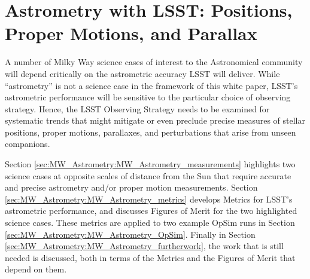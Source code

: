 \section{Astrometry with LSST: Positions, Proper Motions, and Parallax}
\def\secname{MW_Astrometry}\label{sec:\secname} %


A number of Milky Way science cases of interest to the Astronomical
community will depend critically on the astrometric accuracy LSST will
deliver. While ``astrometry'' is not a science case in the framework
of this white paper, LSST's astrometric performance will be sensitive
to the particular choice of observing strategy.
Hence, the LSST Observing Strategy needs to be examined for systematic
trends that might mitigate or even preclude precise measures of
stellar positions, proper motions, parallaxes, and perturbations that
arise from unseen companions.

Section \ref{sec:\secname:MW_Astrometry_measurements} highlights two
science cases at opposite scales of distance from the Sun that require
accurate and precise astrometry and/or proper motion
measurements. Section \ref{sec:\secname:MW_Astrometry_metrics} develops
Metrics for LSST's astrometric performance, and discusses Figures of
Merit for the two highlighted science cases. These metrics are applied to two example OpSim runs in
Section \ref{sec:\secname:MW_Astrometry_OpSim}. Finally in Section
\ref{sec:\secname:MW_Astrometry_furtherwork}, the work that is still
needed is discussed, both in terms of the Metrics and the Figures of
Merit that depend on them.




